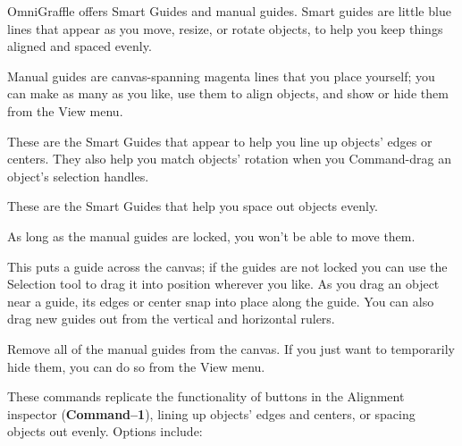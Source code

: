 \documentclass[../main.tex]{subfiles}
\begin{document}
\begin{description}[style=nextline]
  \item[{Guides}] OmniGraffle offers Smart Guides and manual guides. Smart guides are little
    blue lines that appear as you move, resize, or rotate objects, to help you keep things
    aligned and spaced evenly.
  \item[{}] Manual guides are canvas-spanning magenta lines that you place yourself; you can
    make as many as you like, use them to align objects, and show or hide them from the View
    menu.

    \begin{description}[style=nextline]
      \item[{Smart Alignment Guides}] These are the Smart Guides that appear to help you line up
        objects' edges or centers. They also help you match objects' rotation when you
        Command-drag an object's selection handles.
      \item[{Smart Distance Guides}] These are the Smart Guides that help you space out objects
        evenly.
      \item[{Lock/Unlock Guides}] As long as the manual guides are locked, you won't be able to
        move them.
      \item[{New Horizontal/Vertical Guide}] This puts a guide across the canvas; if the guides
        are not locked you can use the Selection tool to drag it into position wherever you like.
        As you drag an object near a guide, its edges or center snap into place along the guide.
        You can also drag new guides out from the vertical and horizontal rulers.
      \item[{Clear Manual Guides}] Remove all of the manual guides from the canvas. If you just
        want to temporarily hide them, you can do so from the View menu.
    \end{description}
  \item[{Align}] These commands replicate the functionality of buttons in the Alignment
    inspector (\textbf{Command--1}), lining up objects' edges and centers, or spacing objects
    out evenly. Options include:


\end{description}
\end{document}
